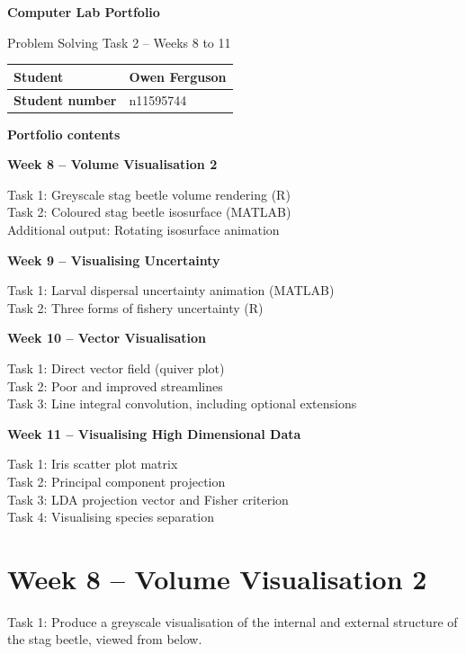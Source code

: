 \documentclass{article}
\begin{document}
\begin{center}\par\vspace{8mm}
{\Huge\bfseries\color{navy} Computer Lab Portfolio}\par
{\Large\color{blue} Problem Solving Task 2 -- Weeks 8 to 11}\par\vspace{10mm}
\begin{tabular}{|p{42mm}|p{105mm}|}\hline
\textbf{Student}&Owen Ferguson\\[3mm]\hline
\textbf{Student number}&n11595744\\[3mm]\hline\end{tabular}
\end{center}\vspace{6mm}
{\LARGE\bfseries\color{navy} Portfolio contents}\par
{\large\bfseries\color{blue} Week 8 -- Volume Visualisation 2}\par
Task 1: Greyscale stag beetle volume rendering (R)\\
Task 2: Coloured stag beetle isosurface (MATLAB)\\
Additional output: Rotating isosurface animation\par
{\large\bfseries\color{blue} Week 9 -- Visualising Uncertainty}\par
Task 1: Larval dispersal uncertainty animation (MATLAB)\\
Task 2: Three forms of fishery uncertainty (R)\par
{\large\bfseries\color{blue} Week 10 -- Vector Visualisation}\par
Task 1: Direct vector field (quiver plot)\\
Task 2: Poor and improved streamlines\\
Task 3: Line integral convolution, including optional extensions\par
{\large\bfseries\color{blue} Week 11 -- Visualising High Dimensional Data}\par
Task 1: Iris scatter plot matrix\\
Task 2: Principal component projection\\
Task 3: LDA projection vector and Fisher criterion\\
Task 4: Visualising species separation
\clearpage\section*{Week 8 -- Volume Visualisation 2}
Task 1: Produce a greyscale visualisation of the internal and external structure of the stag beetle, viewed from below.
\end{document}
